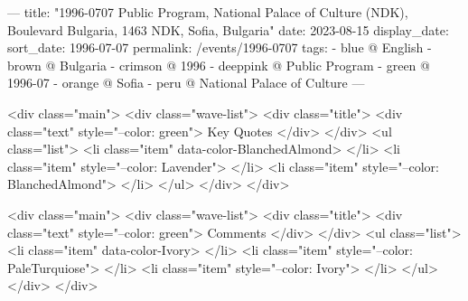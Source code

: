 ---
title: "1996-0707 Public Program, National Palace of Culture (NDK), Boulevard Bulgaria, 1463 NDK, Sofia, Bulgaria"
date: 2023-08-15
display_date: 
sort_date: 1996-07-07
permalink: /events/1996-0707
tags:
  - blue @ English
  - brown @ Bulgaria
  - crimson @ 1996
  - deeppink @ Public Program
  - green @ 1996-07 
  - orange @ Sofia
  - peru @ National Palace of Culture 
---

<div class="main">
  <div class="wave-list">
    <div class="title">
      <div class="text" style="--color: green">
        Key Quotes
      </div>
    </div>
    <ul class="list">
        <li class="item" data-color-BlanchedAlmond>
        </li>
        <li class="item" style="--color: Lavender">
        </li>
        <li class="item" style="--color: BlanchedAlmond">
        </li>
      </ul>
  </div>
</div>

<div class="main">
  <div class="wave-list">
    <div class="title">
      <div class="text" style="--color: green">
        Comments
      </div>
    </div>
    <ul class="list">
        <li class="item" data-color-Ivory>
        </li>
        <li class="item" style="--color: PaleTurquiose">
        </li>
        <li class="item" style="--color: Ivory">
        </li>
      </ul>
  </div>
</div>